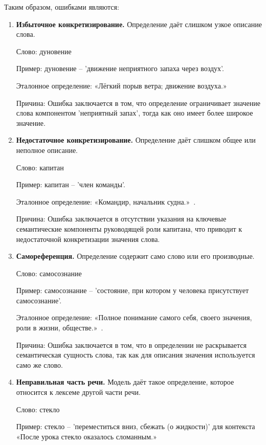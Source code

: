 \documentclass[LI,VKR]{HSEUniversity}
\begin{document}
Таким образом, ошибками являются:

\begin{enumerate}
\item \textbf{Избыточное конкретизирование.} Определение даёт слишком узкое описание слова.

   Слово: дуновение

   Пример: дуновение – ’движение неприятного запаха через воздух’.

   Эталонное определение: «Лёгкий порыв ветра; движение воздуха.»~\cite{TolkovyKuznetsov}

   Причина: Ошибка заключается в том, что определение ограничивает значение слова компонентом ’неприятный запах’, тогда как оно имеет более широкое значение.

\item \textbf{Недостаточное конкретизирование.} Определение даёт слишком общее или неполное описание.

   Слово: капитан

   Пример: капитан – ’член команды’.

   Эталонное определение: «Командир, начальник судна.»~\cite{TolkovyKuznetsov}.

   Причина: Ошибка заключается в отсутствии указания на ключевые семантические компоненты руководящей роли капитана, что приводит к недостаточной конкретизации значения слова.

\item \textbf{Самореференция.} Определение содержит само слово или его производные.

   Слово: самосознание

   Пример: самосознание – ’состояние, при котором у человека присутствует самосознание’.

   Эталонное определение: «Полное понимание самого себя, своего значения, роли в жизни, обществе.»~\cite{TolkovyKuznetsov}.

   Причина: Ошибка заключается в том, что в определении не раскрывается семантическая сущность слова, так как для описания значения используется само же слово.

\item \textbf{Неправильная часть речи.} Модель даёт такое определение, которое относится к лексеме другой части речи.

   Слово: стекло

   Пример: стекло – ’переместиться вниз, сбежать (о жидкости)’ для контекста «После урока стекло оказалось сломанным.»


\end{enumerate}
\end{document}
